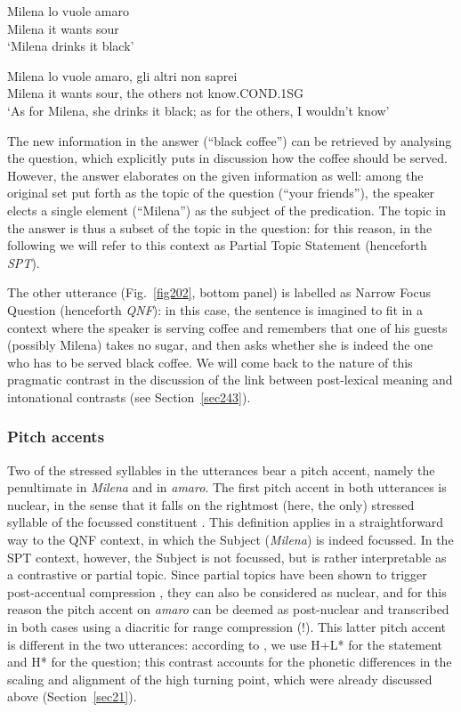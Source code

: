 \ea
\gll Milena lo vuole amaro\\
Milena it wants sour\\
\glt ‘Milena drinks it black’
\z

\ea
\gll Milena lo vuole amaro, gli altri non saprei\\
Milena it wants sour, the others not know.COND.1SG\\
\glt ‘As for Milena, she drinks it black; as for the others, I wouldn't know’
\z

The new information in the answer (``black coffee'') can be retrieved by analysing the question, which explicitly puts in discussion how the coffee should be served. However, the answer elaborates on the given information as well: among the original set put forth as the topic of the question (``your friends''), the speaker elects a single element (``Milena'') as the subject of the predication. The topic in the answer is thus a subset of the topic in the question: for this reason, in the following we will refer to this context as Partial Topic Statement (henceforth \textit{SPT}). 

The other utterance (Fig.~\ref{fig202}, bottom panel) is labelled as Narrow Focus Question (henceforth \textit{QNF}): in this case, the sentence is imagined to fit in a context where the speaker is serving coffee and remembers that one of his guests (possibly Milena) takes no sugar, and then asks whether she is indeed the one who has to be served black coffee. We will come back to the nature of this pragmatic contrast in the discussion of the link between post-lexical meaning and intonational contrasts (see Section~\ref{sec243}).

\subsubsection{Pitch accents}\label{sec2122}
Two of the stressed syllables in the utterances bear a pitch accent, namely the penultimate in \textit{Milena} and in \textit{amaro}. The first pitch accent in both utterances is nuclear, in the sense that it falls on the rightmost (here, the only) stressed syllable of the focussed constituent \cite[380]{grice2005strategy}. This definition applies in a straightforward way to the QNF context, in which the Subject (\textit{Milena}) is indeed focussed. In the SPT context, however, the Subject is not focussed, but is rather interpretable as a contrastive or partial topic. Since partial topics have been shown to trigger post-accentual compression \citep{dimperio2011phrasing}, they can also be considered as nuclear, and for this reason the pitch accent on \textit{amaro} can be deemed as post-nuclear and transcribed in both cases using a diacritic for range compression (!). This latter pitch accent is different in the two utterances: according to \citet{grice2005strategy}, we use H+L* for the statement and H* for the question; this contrast accounts for the phonetic differences in the scaling and alignment of the high turning point, which were already discussed above (Section~\ref{sec21}). 


